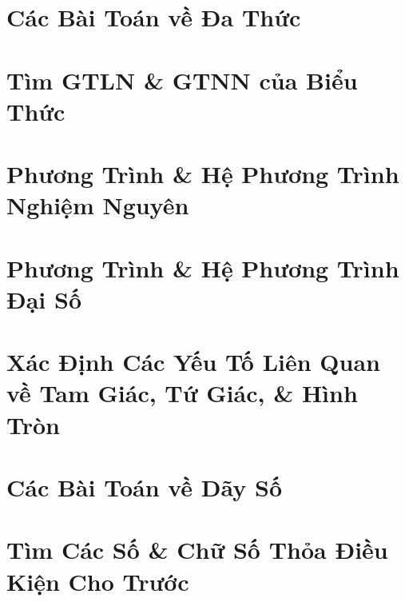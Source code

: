 \documentclass{article}
\begin{document}

\section{Các Bài Toán về Đa Thức}


\section{Tìm GTLN \& GTNN của Biểu Thức}


\section{Phương Trình \& Hệ Phương Trình Nghiệm Nguyên}


\section{Phương Trình \& Hệ Phương Trình Đại Số}


\section{Xác Định Các Yếu Tố Liên Quan về Tam Giác, Tứ Giác, \& Hình Tròn}


\section{Các Bài Toán về Dãy Số}


\section{Tìm Các Số \& Chữ Số Thỏa Điều Kiện Cho Trước}
\end{document}
